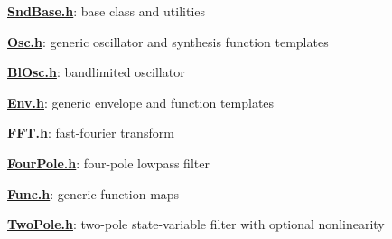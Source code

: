 {\bfseries \hyperlink{_snd_base_8h}{Snd\+Base.\+h}}\+: base class and utilities

{\bfseries \hyperlink{_osc_8h}{Osc.\+h}}\+: generic oscillator and synthesis function templates

{\bfseries \hyperlink{_bl_osc_8h}{Bl\+Osc.\+h}}\+: bandlimited oscillator

{\bfseries \hyperlink{_env_8h}{Env.\+h}}\+: generic envelope and function templates

{\bfseries \hyperlink{_f_f_t_8h}{F\+F\+T.\+h}}\+: fast-\/fourier transform

{\bfseries \hyperlink{_four_pole_8h}{Four\+Pole.\+h}}\+: four-\/pole lowpass filter

{\bfseries \hyperlink{_func_8h}{Func.\+h}}\+: generic function maps

{\bfseries \hyperlink{_two_pole_8h}{Two\+Pole.\+h}}\+: two-\/pole state-\/variable filter with optional nonlinearity 